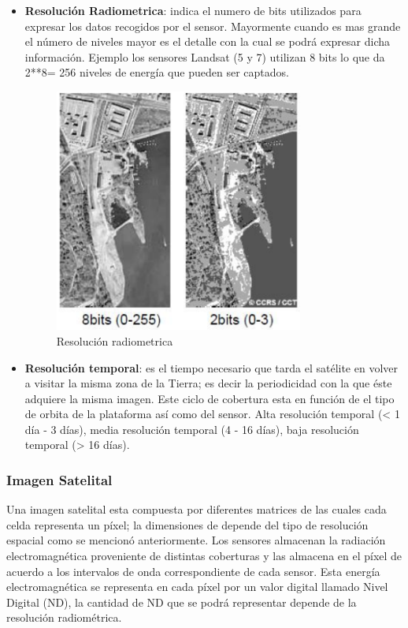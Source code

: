 \begin{itemize}
\item \textbf{Resolución Radiometrica}: indica el numero de bits utilizados para expresar los datos recogidos por el sensor. Mayormente cuando es mas grande el número de niveles mayor es el detalle con la cual se podrá expresar dicha información. Ejemplo los sensores Landsat (5 y 7) utilizan 8 bits lo que da 2**8= 256 niveles de energía que pueden ser captados.
\begin{figure}[H] \centering
  \includegraphics[height=8cm,keepaspectratio=true,clip=true]{imagenes/MarcoTeorico/resolucion_radiometrica.png}
  \caption{Resolución radiometrica}\label{Fig:resolucion-radiometrica}
\end{figure}

\item \textbf{Resolución temporal}: es el tiempo necesario que tarda el satélite en volver a visitar la misma zona de la Tierra; es decir la periodicidad con la que éste adquiere la misma imagen. Este ciclo de cobertura esta en función de el tipo de orbita de la plataforma así como del sensor. Alta resolución temporal (< 1 día - 3 días), media resolución temporal (4 - 16 días), baja resolución temporal (> 16 días).

\end{itemize}

\subsubsection{Imagen Satelital}

Una imagen satelital esta compuesta por diferentes matrices de las cuales cada celda representa un píxel; la dimensiones de depende del tipo de resolución espacial como se mencionó anteriormente. Los sensores almacenan la radiación electromagnética proveniente de distintas coberturas y las almacena en el píxel de acuerdo a los intervalos de onda correspondiente de cada sensor. Esta energía electromagnética se representa en cada píxel por un valor digital llamado Nivel Digital (ND), la cantidad de ND que se podrá representar depende de la resolución radiométrica.

